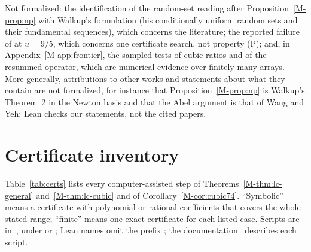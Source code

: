 Not formalized: the identification of the random-set reading after Proposition~\ref{M-prop:np} with Walkup's formulation (his conditionally uniform random sets and their fundamental sequences), which concerns the literature; the reported failure of  at $u=9/5$, which concerns one certificate search, not property (P); and, in Appendix~\ref{M-app:frontier}, the sampled tests of cubic ratios and of the resummed operator, which are numerical evidence over finitely many arrays. More generally, attributions to other works and statements about what they contain are not formalized, for instance that Proposition~\ref{M-prop:np} is Walkup's Theorem~2 in the Newton basis and that the Abel argument is that of Wang and Yeh: Lean checks our statements, not the cited papers.

\section*{Certificate inventory}
Table~\ref{tab:certs} lists every computer-assisted step of Theorems~\ref{M-thm:lc-general} and~\ref{M-thm:lc-cubic} and of Corollary~\ref{M-cor:cubic74}. ``Symbolic'' means a certificate with polynomial or rational coefficients that covers the whole stated range; ``finite'' means one exact certificate for each listed case. Scripts are in~\cite{code}, under  or ; Lean names omit the prefix ; the documentation~\cite{docs} describes each script.

